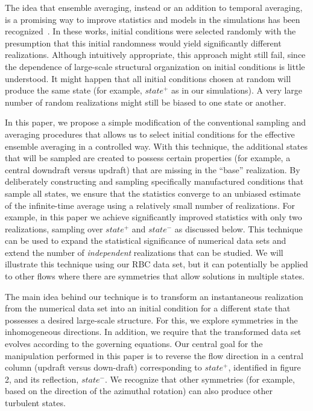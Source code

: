 \documentclass[twocolumn,10pt]{tsfp}
\begin{document}
The idea that ensemble averaging, instead or an addition to temporal averaging, is a promising way to improve statistics and models in the simulations has been recognized~\citep{carati1996ensemble, coleman2000numerical}. In these works, initial conditions were selected randomly with the presumption that this initial randomness would yield significantly different realizations. Although intuitively appropriate, this approach might still fail, since the dependence of large-scale structural organization on initial conditions is little understood. It might happen that all initial conditions chosen at random will produce the same state (for example, $state^+$ as in our simulations). A very large number of random realizations might still be biased to one state or another.  
 
In this paper, we propose a simple modification of the conventional sampling and averaging procedures that allows us to select initial conditions for the effective ensemble averaging in a controlled way. With this technique, the additional states that will be sampled are created to possess certain properties (for example, a central downdraft versus updraft) that are missing in the ``base'' realization. By deliberately constructing and sampling specifically manufactured conditions that sample all states, we ensure that the statistics converge to an unbiased estimate of the infinite-time average using a relatively small number of realizations. For example, in this paper we achieve significantly improved statistics with only two realizations, sampling over $state^+$ and $state^-$ as discussed below. This technique can be used to expand the statistical significance of numerical data sets and extend the number of \textit{independent} realizations that can be studied. We will illustrate this technique using our RBC data set, but it can potentially be applied to other flows where there are symmetries that allow solutions in multiple states. 

The main idea behind our technique is to transform an instantaneous realization from the numerical data set into an initial condition for a different state that possesses a desired large-scale structure. For this, we explore symmetries in the inhomogeneous directions. In addition, we require that the transformed data set evolves according to the governing equations. Our central goal for the manipulation performed in this paper is to reverse the flow direction in a central column (updraft versus down-draft) corresponding to $state^+$, identified in figure 2, and its reflection, $state^-$. We recognize that other symmetries (for example, based on the direction of the azimuthal rotation) can also produce other turbulent states.
\end{document}

